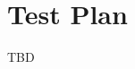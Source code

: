 \documentclass[main.tex]{subfiles}
\begin{document}
	\section{Test Plan}
	
	TBD
	
	
	
\end{document}
